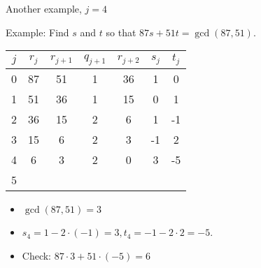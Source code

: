 \documentclass{beamer}
\begin{document}
\begin{frame}{Another example, $j=4$}

Example: Find $s$ and $t$ so that $87s+51t = \gcd(87, 51)$.

\vspace{1em}

\begin{tabular}{|c|c|c|c|c|c|c|}\hline
$j$   &  $r_{j}$    & $r_{j+1}$ & $q_{j+1}$ & $r_{j+2}$ & $s_j$ & $t_j$ \\ \hline\hline
0     &  87         &  51       &    1      &   36      &  1    &   0   \\ \hline
1     &  51         &  36       &    1      &   15      &  0    &   1   \\ \hline
2     &  36         &  15       &    2      &    6      &  1    &  -1   \\ \hline
3     &  15         &   6       &    2      &    3      & -1    &   2   \\ \hline
4     &   6         &   3       &    2      &    0      &  3    &  -5   \\ \hline
5     &             &           &           &           &       &       \\ \hline
\end{tabular}

\vspace{1em}

\begin{itemize}
  \item $\gcd(87,51) = 3$
  \item $s_4 = 1 - 2\cdot (-1) = 3, t_4 = -1 - 2\cdot 2 = -5$.
  \item Check: $87\cdot 3 + 51\cdot (-5) = 6$
\end{itemize}

\end{frame}
\end{document}
